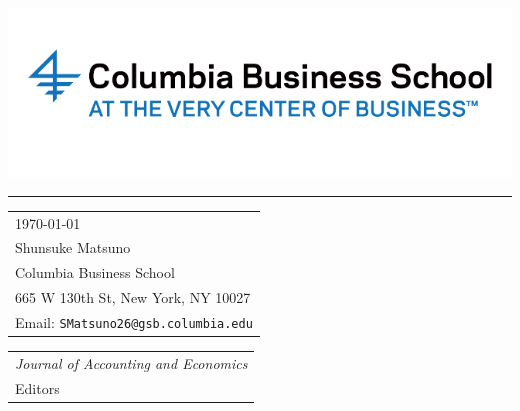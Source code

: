 \documentclass{article}
\begin{document}

\includegraphics[scale=.5]{CBS_logo_long.png} %

\vspace{-1em} %

\rule{\linewidth}{1pt} %

\bigskip\bigskip %


\hfill
\begin{tabular}{l @{}}
	\today \bigskip\\ %
	Shunsuke Matsuno \\
        Columbia Business School\\
	665 W 130th St, New York, NY 10027 \\ %
	Email: \texttt{SMatsuno26@gsb.columbia.edu}
\end{tabular}

\bigskip %


\begin{tabular}{@{} l}
	\textit{Journal of Accounting and Economics}\\
	 Editors \\
\end{tabular}

\bigskip %
\end{document}

